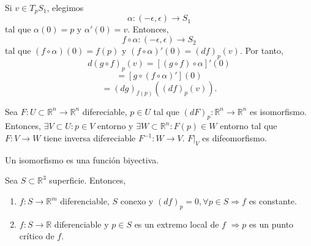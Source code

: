 \begin{dem}
  Si $ v \in T_{p}S_{1}$, elegimos
  \[
    \alpha : (-\epsilon, \epsilon) \to S_{1}
  \]
  tal que $\alpha(0) = p$ y $\alpha'(0) = v$. Entonces,
  \[
    f \circ \alpha : (-\epsilon, \epsilon) \to S_{2}
  \]
  tal que $(f \circ \alpha)(0) = f(p)$ y $(f \circ \alpha)'(0) = (d f)_{p}(v)$. Por tanto,
  \[
    d(g \circ f)_{p}(v) = [(g \circ f) \circ \alpha]'(0)
  \] 
  \[ 
    = [g \circ ( f \circ \alpha)'](0)
  \] 
  \[ 
    = (d g)_{f(p)}((d f)_{p}(v)).
  \] 
\end{dem}

%

\begin{theo}
  Sea $F : U \subset \mathbb{R}^{n} \to \mathbb{R}^{n}$ difereciable, $p \in U$ tal que $(d F)_{p} : \mathbb{R}^{n} \to \mathbb{R}^{n}$ es isomorfismo. Entonces, $\exists V \subset U :  p \in V$ entorno y $\exists W \subset \mathbb{R}^{n} : F(p) \in W$ entorno tal que $F : V \to W$ tiene inversa difereciable $F^{-1} : W \to V$. $F|_{V}$ es difeomorfismo.
\end{theo}

\begin{obs}
  Un isomorfismo es una función biyectiva.
\end{obs}

\begin{prop}
  Sea $S \subset \mathbb{R}^{3}$ superficie. Entonces,
  \begin{enumerate}[label=(\roman*)]
    \item $f : S \to \mathbb{R}^{m}$ diferenciable, $S$ conexo y $(d f)_{p} = 0, \forall p \in S \Rightarrow f$ es constante.
    \item $f : S \to \mathbb{R}$ diferenciable y $p \in S$ es un extremo local de $f$ $\Rightarrow p$ es un punto crítico de $f$.
  \end{enumerate}
\end{prop}

